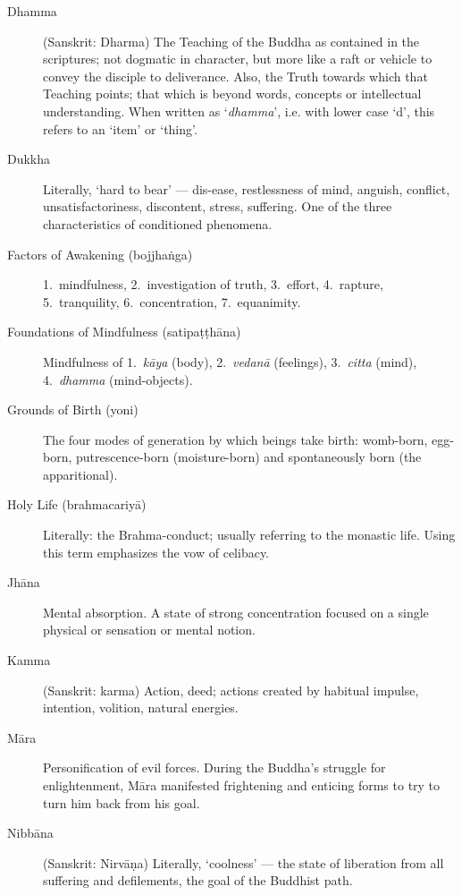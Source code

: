 \begin{description}
\item[Dhamma] (Sanskrit: Dharma) The Teaching of the Buddha as contained
  in the scriptures; not dogmatic in character, but more like a raft or
  vehicle to convey the disciple to deliverance. Also, the Truth towards
  which that Teaching points; that which is beyond words, concepts or
  intellectual understanding. When written as ‘\emph{dhamma}’, i.e.
  with lower case `d', this refers to an ‘item’ or ‘thing’.

\item[Dukkha] Literally, ‘hard to bear’ --- dis-ease, restlessness of
  mind, anguish, conflict, unsatisfactoriness, discontent, stress,
  suffering. One of the three characteristics of conditioned phenomena.

\item[Factors of Awakening (bojjhaṅga)] 1.~mindfulness, 2.~investigation of truth, 3.~effort, 4.~rapture, 5.~tranquility, 6.~concentration, 7.~equanimity.

\item[Foundations of Mindfulness (satipaṭṭhāna)] Mindfulness of 1.~\emph{kāya} (body), 2.~\emph{vedanā} (feelings), 3.~\emph{citta} (mind),
4.~\emph{dhamma} (mind-objects).

\item[Grounds of Birth (yoni)] The four modes of generation by which
  beings take birth: womb-born, egg-born, putrescence-born
  (moisture-born) and spontaneously born (the apparitional).

\item[Holy Life (brahmacariyā)] Literally: the Brahma-conduct; usually
  referring to the monastic life. Using this term emphasizes the vow of
  celibacy.

\item[Jhāna] Mental absorption. A state of strong concentration focused
  on a single physical or sensation or mental notion.

\item[Kamma] (Sanskrit: karma) Action, deed; actions created by habitual
  impulse, intention, volition, natural energies.

\item[Māra] Personification of evil forces. During the Buddha’s struggle
  for enlightenment, Māra manifested frightening and enticing forms to
  try to turn him back from his goal.

\item[Nibbāna] (Sanskrit: Nirvāṇa) Literally, ‘coolness’ --- the state of
  liberation from all suffering and defilements, the goal of the
  Buddhist path.


\end{description}
